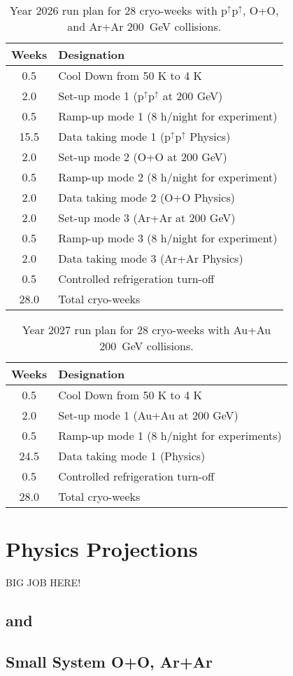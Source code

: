 \begin{table}
\centering
\begin{tabular}{ | c | l | }
\hline
Weeks & Designation \\ \hline
0.5  & Cool Down from 50 K to 4 K \\ \hline
2.0  & Set-up mode 1 (p$^{\uparrow}$p$^{\uparrow}$ at 200 GeV) \\ \hline
0.5  & Ramp-up mode 1 (8 h/night for experiment) \\ \hline
15.5 & Data taking mode 1 (p$^{\uparrow}$p$^{\uparrow}$ Physics) \\ \hline
2.0  & Set-up mode 2 (O+O at 200 GeV) \\ \hline
0.5  & Ramp-up mode 2 (8 h/night for experiment) \\ \hline
2.0 & Data taking mode 2 (O+O Physics) \\ \hline
2.0  & Set-up mode 3 (Ar+Ar at 200 GeV) \\ \hline
0.5  & Ramp-up mode 3 (8 h/night for experiment) \\ \hline
2.0 & Data taking mode 3 (Ar+Ar Physics) \\ \hline
0.5  & Controlled refrigeration turn-off \\ \hline \hline \hline
28.0 & Total cryo-weeks \\
\hline
\end{tabular}
\caption{Year 2026 run plan for 28 cryo-weeks with p$^{\uparrow}$p$^{\uparrow}$, O+O, and Ar+Ar 200~GeV collisions.\label{tab:cryo2026}}
\end{table}


\begin{table}
\centering
\begin{tabular}{ | c | l | }
\hline
Weeks & Designation \\ \hline
0.5  & Cool Down from 50 K to 4 K \\ \hline
2.0  & Set-up mode 1 (Au+Au at 200 GeV) \\ \hline
0.5  & Ramp-up mode 1 (8 h/night for experiments) \\ \hline
24.5 & Data taking mode 1 (Physics) \\ \hline
0.5  & Controlled refrigeration turn-off \\ \hline \hline \hline
28.0 & Total cryo-weeks \\
\hline
\end{tabular}
\caption{Year 2027 run plan for 28 cryo-weeks with Au+Au 200~GeV collisions.
\label{tab:cryoplan2027}}
\end{table}

\section{Physics Projections}

BIG JOB HERE!

\subsection{\pp and \auau}

\subsection{Small System O+O, Ar+Ar}


